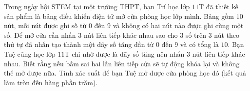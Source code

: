 \begin{bt}%
%
	Trong ngày hội STEM tại một trường THPT, bạn Trí học lớp $11$T đã thiết kế sản phẩm là bảng điều khiển điện tử mở cửa phòng học lớp mình. Bảng gồm $10$ nút, mỗi nút được ghi số từ $0$ đến $9$ và không có hai nút nào được ghi cùng một số. Để mở cửa cần nhấn $3$ nút liên tiếp khác nhau sao cho $3$ số trên $3$ nút theo thứ tự đã nhấn tạo thành một dãy số tăng dần từ $0$ đến $9$ và có tổng là $10$. Bạn Tuệ cũng học lớp $11$T chỉ nhớ được là dãy số tăng nên nhấn $3$ nút liên tiếp khác nhau. Biết rằng nếu bấm sai hai lần liên tiếp cửa sẽ tự động khóa lại và không thể mở được nữa. Tính xác suất để bạn Tuệ mở được cửa phòng học đó (kết quả làm tròn đến hàng phần trăm).
\end{bt}

